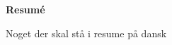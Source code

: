 \documentclass[../main.tex]{subfiles} %
\begin{document}
\begin{center} %
    \textbf{\textsf{Resumé}} %
\end{center}
\vspace{1em} %

Noget der skal stå i resume på dansk
\end{document}
